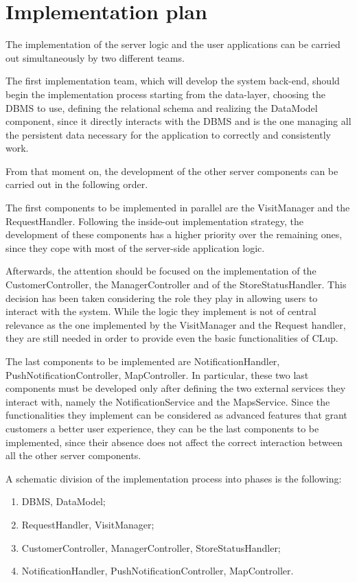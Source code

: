 \documentclass[a4paper,oneside,11pt]{book}
\begin{document}
    \section{Implementation plan}
    The implementation of the server logic and the user applications can be carried out simultaneously by two different teams. \par
    The first implementation team, which will develop the system back-end, should begin the implementation process starting from the data-layer, choosing the DBMS to use, defining the relational schema and realizing the DataModel component, since it directly interacts with the DBMS and is the one managing all the persistent data necessary for the application to correctly and consistently work. \par
    From that moment on, the development of the other server components can be carried out in the following order. \par
    The first components to be implemented in parallel are the VisitManager and the RequestHandler. Following the inside-out implementation strategy, the development of these components has a higher priority over the remaining ones, since they cope with most of the server-side application logic. \par
    Afterwards, the attention should be focused on the implementation of the CustomerController, the ManagerController and of the StoreStatusHandler. This decision has been taken considering the role they play in allowing users to interact with the system. While the logic they implement is not of central relevance as the one implemented by the VisitManager and the Request handler, they are still needed in order to provide even the basic functionalities of CLup. \par
    The last components to be implemented are NotificationHandler, PushNotificationController, MapController. In particular, these two last components must be developed only after defining the two external services they interact with, namely the NotificationService and the MapsService. Since the functionalities they implement can be considered as advanced features that grant customers a better user experience, they can be the last components to be implemented, since their absence does not affect the correct interaction between all the other server components. \par
    A schematic division of the implementation process into phases is the following:
    \begin{enumerate}
        \item DBMS, DataModel;
        \item RequestHandler, VisitManager;
        \item CustomerController, ManagerController, StoreStatusHandler;
        \item NotificationHandler, PushNotificationController, MapController.
    \end{enumerate}
\end{document}
